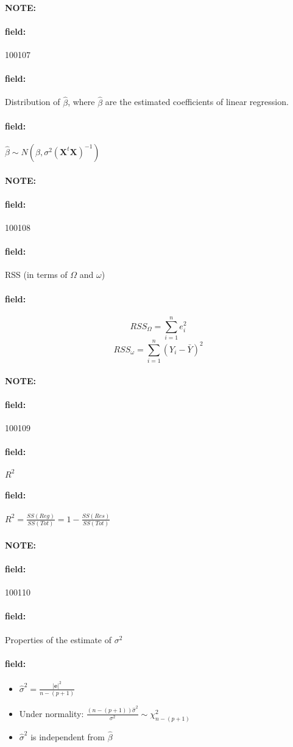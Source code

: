 \documentclass[12pt]{article}
\newenvironment{note}{\paragraph{NOTE:}}{}
\newenvironment{field}{\paragraph{field:}}{}
\begin{document}
\begin{note} \begin{field} \tiny 100107 \end{field}
 \begin{field}
  Distribution of $\hat{\beta}$, where $\hat{\beta}$ are the estimated coefficients of linear regression.
 \end{field}
 \begin{field}
  $\hat{\beta} \sim N(\beta, \sigma^2(\mathbf{X}^t \mathbf{X})^{-1})$
 \end{field}
\end{note}

\begin{note} \begin{field} \tiny 100108 \end{field}
 \begin{field}
  RSS (in terms of $\Omega$ and $\omega$)
 \end{field}
 \begin{field}
  $$RSS_\Omega = \sum_{i=1}^n e_i^2$$
  $$RSS_\omega = \sum_{i=1}^n (Y_i - \bar{Y})^2$$
 \end{field}
\end{note}


\begin{note} \begin{field} \tiny 100109 \end{field}
 \begin{field}
  $R^2$
 \end{field}
 \begin{field}
  $R^2 = \frac{SS(Reg)}{SS(Tot)} = 1 - \frac{SS(Res)}{SS(Tot)}$
 \end{field}
\end{note}



\begin{note} \begin{field} \tiny 100110 \end{field}
 \begin{field}
  Properties of the estimate of $\sigma^2$
 \end{field}
 \begin{field}
  \begin{itemize}
   \item   $\hat{\sigma}^2 = \frac{|\mathbf{e}|^2}{n - (p+1)}$
   \item Under normality: $\frac{(n - (p+1))\hat{\sigma}^2}{\sigma^2} \sim \chi^2_{n - (p+1)}$
   \item $\hat{\sigma}^2$ is independent from $\hat{\beta}$
  \end{itemize}
 \end{field}
\end{note}
\end{document}
